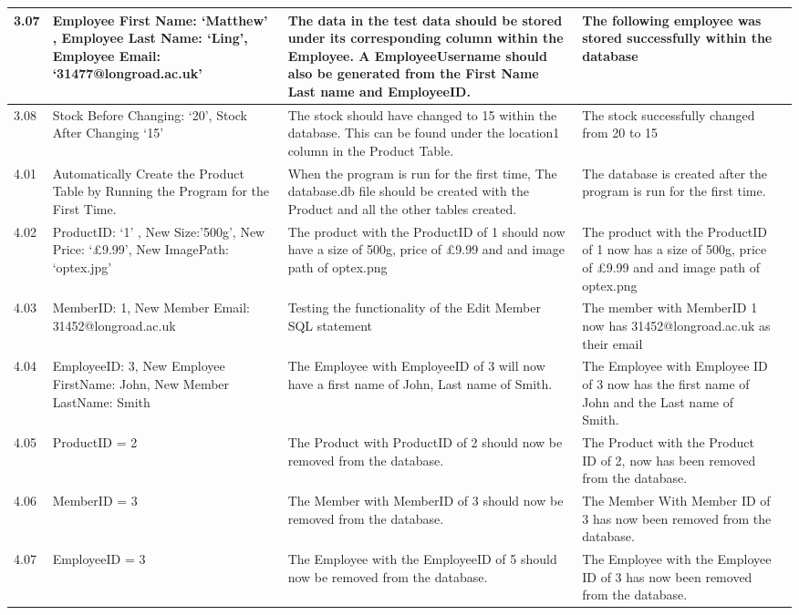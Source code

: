 \begin{flushleft}
\begin{longtable}{|p{1.0cm}|p{2.5cm}|p{3cm}|p{3.0cm}|p{2.5cm}|}
	3.07 & Employee First Name: `Matthew' , Employee Last Name: `Ling', Employee Email: `31477@longroad.ac.uk' & The data in the test data should be stored under its corresponding column within the Employee. A EmployeeUsername should also be generated from the First Name Last name and EmployeeID. & The following employee was stored successfully within the database& \\ \hline
	3.08 &  Stock Before Changing: `20', Stock After Changing `15'  & The stock should have changed to 15 within the database. This can be found under the location1 column in the Product Table.& The stock successfully changed from 20 to 15&  \\ \hline
	4.01 & Automatically Create the Product Table by Running the Program for the First Time. & When the program is run for the first time, The database.db file should be created with the Product and all the other tables created. & The database is created after the program is run for the first time. &  \\ \hline
	4.02 & ProductID: `1' ,  New Size:'500g', New Price: `£9.99',  New ImagePath: `optex.jpg' & The product with the ProductID of 1 should now have a size of 500g, price of £9.99 and and image path of optex.png& The product with the ProductID of 1 now has a size of 500g, price of £9.99 and and image path of optex.png&  \\ \hline
	4.03 & MemberID: 1, New Member Email: 31452@longroad.ac.uk & Testing the functionality of the Edit Member SQL statement & The member with MemberID 1 now has 31452@longroad.ac.uk as their email & \\ \hline
	4.04 & EmployeeID: 3, New Employee FirstName: John, New Member LastName: Smith  & The Employee with EmployeeID of 3 will now have a first name of John, Last name of Smith.& The Employee with Employee ID of 3 now has the first name of John and the Last name of Smith. &  \\ \hline 
	4.05 & ProductID = 2 & The Product with ProductID of 2 should now be removed from the database.& The Product with the Product ID of 2, now has been removed from the database.& \\ \hline
	4.06 & MemberID = 3 & The Member with MemberID of 3 should now be removed from the database.& The Member With Member ID of 3 has now been removed from the database.& \\ \hline
	4.07 & EmployeeID = 3 & The Employee with the EmployeeID of 5 should now be removed from the database. & The Employee with the Employee ID of 3 has now been removed from the database.&  \\ \hline

\end{longtable}
\end{flushleft}
